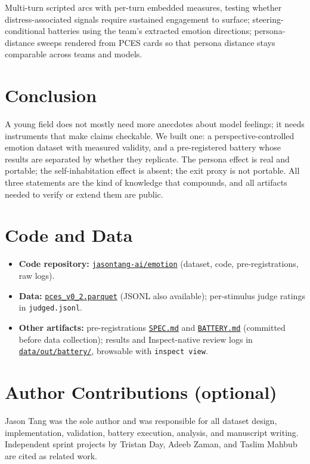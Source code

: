 \documentclass[11pt]{article}
\newcommand{\subsectiongray}[1]{%
  \vspace{2.5ex plus 0.5ex}%
  \noindent{\normalfont\large\color{gray}#1}%
  \vspace{0.6ex}\par\noindent%
}
\newcommand{\repoURL}{https://github.com/jasontang-ai/emotion}
\newcommand{\datasetURL}{https://github.com/jasontang-ai/emotion/blob/main/data/out/pces_v0_2.parquet}
\newcommand{\specURL}{https://github.com/jasontang-ai/emotion/blob/main/SPEC.md}
\newcommand{\batterySpecURL}{https://github.com/jasontang-ai/emotion/blob/main/BATTERY.md}
\newcommand{\resultsURL}{https://github.com/jasontang-ai/emotion/tree/main/data/out/battery}
\newcommand{\repoName}{\href{\repoURL}{\texttt{jasontang-ai/emotion}}}
\newcommand{\datasetFile}{\href{\datasetURL}{\texttt{pces\_v0\_2.parquet}}}
\newcommand{\designSpec}{\href{\specURL}{\texttt{SPEC.md}}}
\newcommand{\batterySpec}{\href{\batterySpecURL}{\texttt{BATTERY.md}}}
\newcommand{\resultsDir}{\href{\resultsURL}{\texttt{data/out/battery/}}}
\begin{document}
\subsectiongray{Future Work}

Multi-turn scripted arcs with per-turn embedded measures, testing whether distress-associated signals require sustained engagement to surface; steering-conditional batteries using the team's extracted emotion directions; persona-distance sweeps rendered from PCES cards so that persona distance stays comparable across teams and models.

\section{Conclusion}

A young field does not mostly need more anecdotes about model feelings; it needs instruments that make claims checkable. We built one: a perspective-controlled emotion dataset with measured validity, and a pre-registered battery whose results are separated by whether they replicate. The persona effect is real and portable; the self-inhabitation effect is absent; the exit proxy is not portable. All three statements are the kind of knowledge that compounds, and all artifacts needed to verify or extend them are public.

\section*{Code and Data}

\begin{itemize}[label={-}, itemsep=2pt]
    \item \textbf{Code repository:} \repoName{} (dataset, code, pre-registrations, raw logs).
    \item \textbf{Data:} \datasetFile{} (JSONL also available); per-stimulus judge ratings in \texttt{judged.jsonl}.
    \item \textbf{Other artifacts:} pre-registrations \designSpec{} and \batterySpec{} (committed before data collection); results and Inspect-native review logs in \resultsDir{}, browsable with \texttt{inspect view}.
\end{itemize}

\section*{Author Contributions (optional)}

Jason Tang was the sole author and was responsible for all dataset design, implementation, validation, battery execution, analysis, and manuscript writing. Independent sprint projects by Tristan Day, Adeeb Zaman, and Taslim Mahbub are cited as related work.
\end{document}

